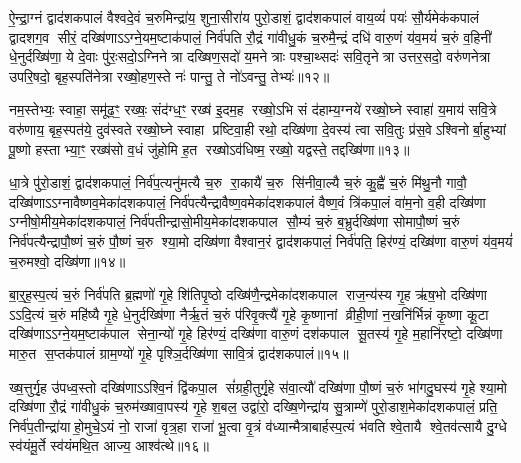 {\anuvakamend[{सुभे॑षजमिहि॒ त्रीणि॑ च॥६॥}]}

ऐ॒न्द्रा॒ग्नं द्वाद॑शकपालं वैश्वदे॒वं च॒रुमिन्द्रा॑य॒ शुना॒सीरा॑य पुरो॒डाशं॒ द्वाद॑शकपालं वाय॒व्यं॑ पयः॑ सौ॒र्यमेक॑कपालं द्वादशग॒व सीरं॒ दख्षि॑णाऽऽग्ने॒यम॒ष्टाक॑पालं॒ निर्व॑पति रौ॒द्रं गा॑वीधु॒कं च॒रुमै॒न्द्रं दधि॑ वारु॒णं य॑व॒मयं॑ च॒रुं व॒हिनी॑ धे॒नुर्दख्षि॑णा॒ ये दे॒वाः पु॑रः॒सदो॒ऽग्निनेत्रा दख्षिण॒सदो॑ य॒मनेत्राः पश्चा॒थ्सदः॑ सवि॒तृनेत्रा उत्तर॒सदो॒ वरु॑णनेत्रा उपरि॒षदो॒ बृह॒स्पति॑नेत्रा रख्षो॒हण॒स्ते नः॑ पान्तु॒ ते नो॑ऽवन्तु॒ तेभ्यः॑॥१२॥

नम॒स्तेभ्यः॒ स्वाहा॒ समू॑ढ॒ꣳ॒ रख्षः॒ संद॑ग्ध॒ꣳ॒ रख्ष॑ इ॒दम॒ह रख्षो॒ऽभि सं द॑हाम्य॒ग्नये॑ रख्षो॒घ्ने स्वाहा॑ य॒माय॑ सवि॒त्रे वरु॑णाय॒ बृह॒स्पत॑ये॒ दुव॑स्वते रख्षो॒घ्ने स्वाहा प्रष्टिवा॒ही रथो॒ दख्षि॑णा दे॒वस्य॑ त्वा सवि॒तुः प्र॑स॒वेऽश्विनोर्बा॒हुभ्यां पू॒ष्णो हस्ताभ्या॒ꣳ॒ रख्ष॑सो व॒धं जु॑होमि ह॒त रख्षोऽव॑धिष्म॒ रख्षो॒ यद्वस्ते॒ तद्दख्षि॑णा॥१३॥

{\anuvakamend[{तेभ्यः॒ पञ्च॑चत्वारिशच्च॥७॥}]}

धा॒त्रे पु॑रो॒डाशं॒ द्वाद॑शकपालं॒ निर्व॑प॒त्यनु॑मत्यै च॒रु रा॒कायै॑ च॒रु सि॑नीवा॒ल्यै च॒रुं कु॒ह्वै॑ च॒रुं मि॑थु॒नौ गावौ॒ दख्षि॑णाऽऽग्नावैष्णव॒मेका॑दशकपालं॒ निर्व॑पत्यैन्द्रावैष्ण॒वमेका॑दशकपालं वैष्ण॒वं त्रि॑कपा॒लं वा॑म॒नो व॒ही दख्षि॑णा ऽग्नीषो॒मीय॒मेका॑दशकपालं॒ निर्व॑पतीन्द्रासो॒मीय॒मेका॑दशकपाल सौ॒म्यं च॒रुं ब॒भ्रुर्दख्षि॑णा सोमापौ॒ष्णं च॒रुं निर्व॑पत्यैन्द्रापौ॒ष्णं च॒रुं पौ॒ष्णं च॒रु श्या॒मो दख्षि॑णा वैश्वान॒रं द्वाद॑शकपालं॒ निर्व॑पति॒ हिर॑ण्यं॒ दख्षि॑णा वारु॒णं य॑व॒मयं॑ च॒रुमश्वो॒ दख्षि॑णा॥१४॥

{\anuvakamend[{निर॒ष्टौ च॥८॥}]}

बा॒र्॒\mbox{}ह॒स्प॒त्यं च॒रुं निर्व॑पति ब्र॒ह्मणो॑ गृ॒हे शि॑तिपृ॒ष्ठो दख्षि॑णै॒न्द्रमेका॑दशकपाल राज॒न्य॑स्य गृ॒ह ऋ॑ष॒भो दख्षि॑णा ऽऽदि॒त्यं च॒रुं महि॑ष्यै गृ॒हे धे॒नुर्दख्षि॑णा नैर्\mbox{}ऋ॒तं च॒रुं प॑रिवृ॒क्त्यै॑ गृ॒हे कृ॒ष्णानां व्रीही॒णां न॒खनि॑र्भिन्नं कृ॒ष्णा कू॒टा दख्षि॑णाऽऽग्ने॒यम॒ष्टाक॑पाल सेना॒न्यो॑ गृ॒हे हिर॑ण्यं॒ दख्षि॑णा वारु॒णं दश॑कपाल सू॒तस्य॑ गृ॒हे म॒हानि॑रष्टो॒ दख्षि॑णा मारु॒त स॒प्तक॑पालं ग्राम॒ण्यो॑ गृ॒हे पृश्ञि॒र्दख्षि॑णा सावि॒त्रं द्वाद॑शकपालं॥१५॥

ख्ष॒त्तुर्गृ॒ह उ॑पध्व॒स्तो दख्षि॑णाऽऽश्वि॒नं द्वि॑कपा॒ल सं॑ग्रही॒तुर्गृ॒हे स॑वा॒त्यौ॑ दख्षि॑णा पौ॒ष्णं च॒रुं भा॑गदु॒घस्य॑ गृ॒हे श्या॒मो दख्षि॑णा रौ॒द्रं गा॑वीधु॒कं च॒रुम॑ख्षावा॒पस्य॑ गृ॒हे श॒बल॒ उद्वा॑रो॒ दख्षि॒णेन्द्रा॑य सु॒त्राम्णे॑ पुरो॒डाश॒मेका॑दशकपालं॒ प्रति॒ निर्व॑प॒तीन्द्रा॑याहो॒मुचे॒ऽयं नो॒ राजा॑ वृत्र॒हा राजा॑ भू॒त्वा वृ॒त्रं व॑ध्यान्मैत्राबार्\mbox{}हस्प॒त्यं भ॑वति श्वे॒तायै श्वे॒तव॑त्सायै दु॒ग्धे स्व॑यंमू॒र्ते स्व॑यंमथि॒त आज्य॒ आश्व॑त्थे॥१६॥

